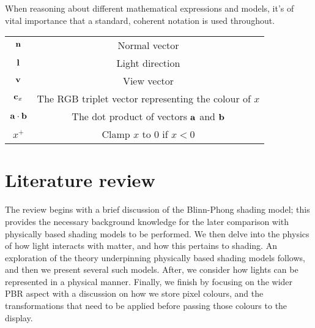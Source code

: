 When reasoning about different mathematical expressions and models, it's of vital importance that a standard, coherent notation is used throughout.

\begin{center}
	\begin{tabular}{ c c }
		\hline
		\begin{math}\mathbf{n}\end{math} & Normal vector \\
		\begin{math}\mathbf{l}\end{math} & Light direction \\
		\begin{math}\mathbf{v}\end{math} & View vector \\
		\begin{math}\mathbf{c}_{x}\end{math} & The RGB triplet vector representing the colour of \begin{math}x\end{math}\\
		\begin{math}\mathbf{a}\cdot\mathbf{b}\end{math} & The dot product of vectors \begin{math}\mathbf{a}\end{math} and \begin{math}\mathbf{b}\end{math} \\
		\begin{math}x^+\end{math} & Clamp \begin{math}x\end{math} to \begin{math}0\end{math} if \begin{math}x<0\end{math} \\
		\hline
	\end{tabular}
\end{center}

\section{Literature review}

The review begins with a brief discussion of the Blinn-Phong shading model; this provides the necessary background knowledge for the later comparison with physically based shading models to be performed. We then delve into the physics of how light interacts with matter, and how this pertains to shading. An exploration of the theory underpinning physically based shading models follows, and then we present several such models. After, we consider how lights can be represented in a physical manner. Finally, we finish by focusing on the wider PBR aspect with a discussion on how we store pixel colours, and the transformations that need to be applied before passing those colours to the display.

